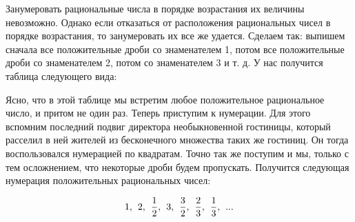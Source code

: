 \documentclass{article}
\begin{document}
Занумеровать рациональные числа в порядке возрастания их величины невозможно. Однако если отказаться от расположения рациональных чисел в порядке возрастания, то занумеровать их все же удается. Сделаем так: выпишем сначала все положительные дроби со знаменателем 1, потом все положительные дроби со знаменателем 2, потом со знаменателем 3 и т. д. У нас получится таблица следующего вида:

\begin{center}
\end{center}

Ясно, что в этой таблице мы встретим любое положительное рациональное число, и притом не один раз. Теперь приступим к нумерации. Для этого вспомним последний подвиг директора необыкновенной гостиницы, который расселил в ней жителей из бесконечного множества таких же гостиниц. Он тогда воспользовался нумерацией по квадратам. Точно так же поступим и мы, только с тем осложнением, что некоторые дроби будем пропускать. Получится следующая нумерация положительных рациональных чисел:

\[
1, \hspace{1.5mm} 2, \hspace{1.5mm} {1 \over 2}, \hspace{1.5mm} 3, \hspace{1.5mm} {3 \over 2}, \hspace{1.5mm} {2 \over 3}, \hspace{1.5mm} {1 \over 3}, \hspace{1.5mm} ...
\]
\end{document}
